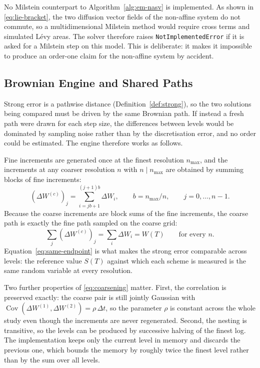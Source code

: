 \documentclass[11pt,a4paper]{article}
\theoremstyle{definition}
\theoremstyle{remark}
\begin{document}
No Milstein counterpart to Algorithm~\ref{alg:em-nasv} is implemented. As shown
in \eqref{eq:lie-bracket}, the two diffusion vector fields of the non-affine
system do not commute, so a multidimensional Milstein method would require
cross terms and simulated L\'evy areas. The solver therefore raises
\texttt{NotImplementedError} if it is asked for a Milstein step on this model.
This is deliberate: it makes it impossible to produce an order-one claim for
the non-affine system by accident.

\subsection{Brownian Engine and Shared Paths}
\label{sec:engine}

Strong error is a pathwise distance (Definition~\ref{def:strong}), so the two
solutions being compared must be driven by the same Brownian path. If instead a
fresh path were drawn for each step size, the differences between levels would
be dominated by sampling noise rather than by the discretisation error, and no
order could be estimated. The engine therefore works as follows.

Fine increments are generated once at the finest resolution $n_{\max}$, and the
increments at any coarser resolution $n$ with $n \mid n_{\max}$ are obtained by
summing blocks of fine increments:
\begin{equation}
    \left( \Delta W^{(c)} \right)_j
    = \sum_{i = j b + 1}^{(j+1) b} \Delta W_i,
    \qquad b = n_{\max} / n, \qquad j = 0, \ldots, n-1 .
    \label{eq:coarsening}
\end{equation}
Because the coarse increments are block sums of the fine increments, the coarse
path is exactly the fine path sampled on the coarse grid:
\begin{equation}
    \sum_{j} \left( \Delta W^{(c)} \right)_j = \sum_{i} \Delta W_i = W(T)
    \qquad \text{for every } n .
    \label{eq:same-endpoint}
\end{equation}
Equation~\eqref{eq:same-endpoint} is what makes the strong error comparable
across levels: the reference value $S(T)$ against which each scheme is measured
is the same random variable at every resolution.

Two further properties of \eqref{eq:coarsening} matter. First, the correlation
is preserved exactly: the coarse pair is still jointly Gaussian with
$\operatorname{Cov}\!\left( \Delta W^{(1)}, \Delta W^{(2)} \right)
= \rho\, \Delta t$, so the parameter $\rho$ is constant across the whole study
even though the increments are never regenerated. Second, the nesting is
transitive, so the levels can be produced by successive halving of the finest
log. The implementation keeps only the current level in memory and discards the
previous one, which bounds the memory by roughly twice the finest level rather
than by the sum over all levels.
\end{document}
